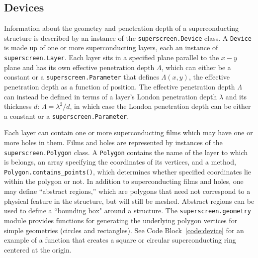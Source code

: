 \documentclass[preprint,12pt]{elsarticle}
\begin{document}
\subsection{Devices}
\label{section:overview:device}

Information about the geometry and penetration depth of a superconducting structure is described by an instance of the \texttt{superscreen.Device} class. A \texttt{Device} is made up of one or more superconducting layers, each an instance of  \texttt{superscreen.Layer}. Each layer sits in a specified plane parallel to the $x-y$ plane and has its own effective penetration depth $\Lambda$, which can either be a constant or a \texttt{superscreen.Parameter} that defines $\Lambda(x, y)$, the effective penetration depth as a function of position. The effective penetration depth $\Lambda$ can instead be defined in terms of a layer's London penetration depth $\lambda$ and its thickness $d$: $\Lambda=\lambda^2/d$, in which case the London penetration depth can be either a constant or a \texttt{superscreen.Parameter}.

Each layer can contain one or more superconducting films which may have one or more holes in them. Films and holes are represented by instances of the \texttt{superscreen.Polygon} class. A \texttt{Polygon} contains the name of the layer to which is belongs, an array specifying the coordinates of its vertices, and a method, \texttt{Polygon.contains_points()}, which determines whether specified coordinates lie within the polygon or not. In addition to superconducting films and holes, one may define ``abstract regions,'' which are polygons that need not correspond to a physical feature in the structure, but will still be meshed. Abstract regions can be used to define a ``bounding box" around a structure. The \texttt{superscreen.geometry} module provides functions for generating the underlying polygon vertices for simple geometries (circles and rectangles). See Code Block~\ref{code:device} for an example of a function that creates a square or circular superconducting ring centered at the origin.
\end{document}

